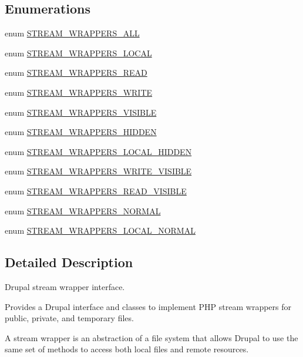 \subsection*{Enumerations}
\begin{DoxyCompactItemize}
\item 
enum \hyperlink{stream__wrappers_8inc_aa396b3c5df01b437c006cf7ee9674f66}{STREAM\_\-WRAPPERS\_\-ALL} 
\item 
enum \hyperlink{stream__wrappers_8inc_a39ccf9b3cad23926ae87f5c5e9d9f05d}{STREAM\_\-WRAPPERS\_\-LOCAL} 
\item 
enum \hyperlink{stream__wrappers_8inc_afed584acf18401455602dac60e54a5ae}{STREAM\_\-WRAPPERS\_\-READ} 
\item 
enum \hyperlink{stream__wrappers_8inc_ade674b37b69a2408df3995d697672c87}{STREAM\_\-WRAPPERS\_\-WRITE} 
\item 
enum \hyperlink{stream__wrappers_8inc_a353d633ead3baf499548817365879c3d}{STREAM\_\-WRAPPERS\_\-VISIBLE} 
\item 
enum \hyperlink{stream__wrappers_8inc_a47c8b4e8cd87675bf66f39a328757f87}{STREAM\_\-WRAPPERS\_\-HIDDEN} 
\item 
enum \hyperlink{stream__wrappers_8inc_a93d62c940aa35a365d0226379dcb9a8e}{STREAM\_\-WRAPPERS\_\-LOCAL\_\-HIDDEN} 
\item 
enum \hyperlink{stream__wrappers_8inc_af9258db142c2bc34a37fb4797367e30f}{STREAM\_\-WRAPPERS\_\-WRITE\_\-VISIBLE} 
\item 
enum \hyperlink{stream__wrappers_8inc_a2efceeff10f6144584b131d04f87afcc}{STREAM\_\-WRAPPERS\_\-READ\_\-VISIBLE} 
\item 
enum \hyperlink{stream__wrappers_8inc_a36f5ace0de0c330620586d4f92e9774d}{STREAM\_\-WRAPPERS\_\-NORMAL} 
\item 
enum \hyperlink{stream__wrappers_8inc_a2c85af579fa282a57c975e99eba90c63}{STREAM\_\-WRAPPERS\_\-LOCAL\_\-NORMAL} 
\end{DoxyCompactItemize}


\subsection{Detailed Description}
Drupal stream wrapper interface.

Provides a Drupal interface and classes to implement PHP stream wrappers for public, private, and temporary files.

A stream wrapper is an abstraction of a file system that allows Drupal to use the same set of methods to access both local files and remote resources.

